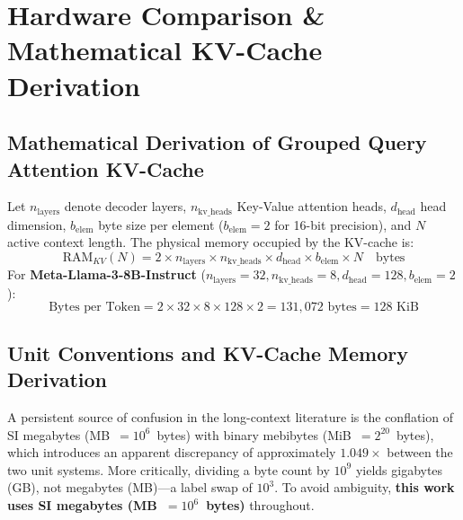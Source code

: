 \documentclass[11pt,a4paper]{article}
\begin{document}
\section{Hardware Comparison \& Mathematical KV-Cache Derivation}
\label{sec:hardware}

\subsection{Mathematical Derivation of Grouped Query Attention KV-Cache}
Let $n_{\text{layers}}$ denote decoder layers, $n_{\text{kv\_heads}}$ Key-Value attention heads, $d_{\text{head}}$ head dimension, $b_{\text{elem}}$ byte size per element ($b_{\text{elem}} = 2$ for 16-bit precision), and $N$ active context length. The physical memory occupied by the KV-cache is:
\begin{equation}
\text{RAM}_{KV}(N) = 2 \times n_{\text{layers}} \times n_{\text{kv\_heads}} \times d_{\text{head}} \times b_{\text{elem}} \times N \quad \text{bytes}
\end{equation}
For \textbf{Meta-Llama-3-8B-Instruct} ($n_{\text{layers}} = 32, n_{\text{kv\_heads}} = 8, d_{\text{head}} = 128, b_{\text{elem}} = 2$):
\begin{equation}
\text{Bytes per Token} = 2 \times 32 \times 8 \times 128 \times 2 = 131,072 \text{ bytes} = 128 \text{ KiB}
\end{equation}

\subsection{Unit Conventions and KV-Cache Memory Derivation}
A persistent source of confusion in the long-context literature is the conflation of SI megabytes (MB~$=10^6$~bytes) with binary mebibytes (MiB~$=2^{20}$~bytes), which introduces an apparent discrepancy of approximately $1.049\times$ between the two unit systems. More critically, dividing a byte count by $10^9$ yields gigabytes (GB), not megabytes (MB)---a label swap of $10^3$. To avoid ambiguity, \textbf{this work uses SI megabytes (MB~$=10^6$~bytes)} throughout.
\end{document}
